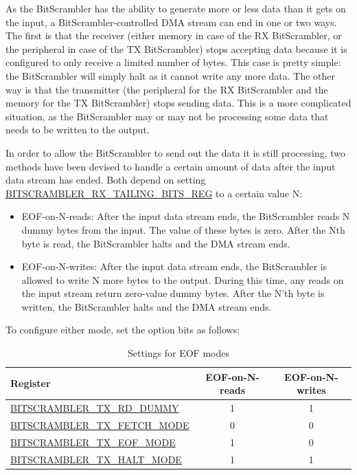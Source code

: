 \documentclass[main\_\_EN.tex]{subfiles}
\begin{document}
As the BitScrambler has the ability to generate more or less data than it gets on the input, a BitScrambler-controlled DMA stream can end in one or two ways. The first is that the receiver (either memory in case of the RX BitScrambler, or the peripheral in case of the TX BitScrambler) stops accepting data because it is configured to only receive a limited number of bytes. This case is pretty simple: the BitScrambler will simply halt as it cannot write any more data. The other way is that the transmitter (the peripheral for the RX BitScrambler and the memory for the TX BitScrambler) stops sending data. This is a more complicated situation, as the BitScrambler may or may not be processing some data that needs to be written to the output.

In order to allow the BitScrambler to send out the data it is still processing, two methods have been devised to handle a certain amount of data after the input data stream has ended. Both depend on setting \hyperref[regdesc:BITSCRAMBLERRXTAILINGBITSREG]{BITSCRAMBLER\_RX\_TAILING\_BITS\_REG} to a certain value N:

\begin{itemize}
\item EOF-on-N-reads: After the input data stream ends, the BitScrambler reads N dummy bytes from the input. The value of these bytes is zero. After the Nth byte is read, the BitScrambler halts and the DMA stream ends.

\item EOF-on-N-writes: After the input data stream ends, the BitScrambler is allowed to write N more bytes to the output. During this time, any reads on the input stream return zero-value dummy bytes. After the N'th byte is written, the BitScrambler halts and the DMA stream ends.
\end{itemize}

To configure either mode, set the option bits as follows:



\begin{table}[H]
\centering
\caption{Settings for EOF modes}
\label{tab:bitscrm-settings-for-eof-modes}
\begin{tabular}{|l|c|c|}
\hline\rowcolor{lightgray}
Register & EOF-on-N-reads & EOF-on-N-writes \\
\hline
\hyperref[fielddesc:BITSCRAMBLERTXRDDUMMY]{BITSCRAMBLER\_TX\_RD\_DUMMY} & 1 & 1 \\ \hline
\hyperref[fielddesc:BITSCRAMBLERTXFETCHMODE]{BITSCRAMBLER\_TX\_FETCH\_MODE} & 0 & 0 \\ \hline
\hyperref[fielddesc:BITSCRAMBLERTXEOFMODE]{BITSCRAMBLER\_TX\_EOF\_MODE} & 1 & 0 \\ \hline
\hyperref[fielddesc:BITSCRAMBLERTXHALTMODE]{BITSCRAMBLER\_TX\_HALT\_MODE} & 1 & 1 \\\hline
\end{tabular}
\end{table}
\end{document}
